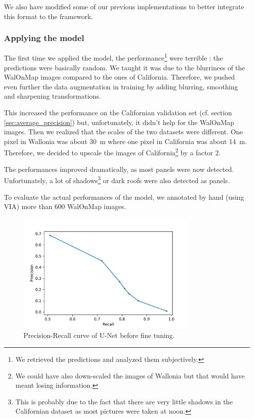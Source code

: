\documentclass[a4paper, 12pt]{article}
\begin{document}
\begin{note}
We also have modified some of our previous implementations to better integrate this format to the framework.
\end{note}

\subsubsection{Applying the model}

The first time we applied the model, the performance\footnote{We retrieved the predictions and analyzed them subjectively.} were terrible : the predictions were basically random. We taught it was due to the blurriness of the WalOnMap images compared to the ones of California. Therefore, we pushed even further the data augmentation in training by adding blurring, smoothing and sharpening transformations.

This increased the performance on the Californian validation set (cf. section \ref{sec:average_precision}) but, unfortunately, it didn't help for the WalOnMap images. Then we realized that the scales of the two datasets were different. One pixel in Wallonia was about \SI{30}{\meter} where one pixel in California was about \SI{14}{\meter}. Therefore, we decided to upscale the images of California\footnote{We could have also down-scaled the images of Wallonia but that would have meant losing information.} by a factor \num{2}.

The performances improved dramatically, as most panels were now detected. Unfortunately, a lot of shadows\footnote{This is probably due to the fact that there are very little shadows in the Californian dataset as most pictures were taken at noon.} or dark roofs were also detected as panels.

To evaluate the actual performances of the model, we annotated by hand (using VIA) more than 600 WalOnMap images.

\begin{figure}[h]
    \centering
    \vspace{-0.5em}
    \includegraphics[width=0.8\textwidth]{resources/pdf/precision_recall_before.pdf}
    \caption{Precision-Recall curve of U-Net before fine tuning.}
    \label{fig:before_fine_tuning}
\end{figure}
\end{document}
